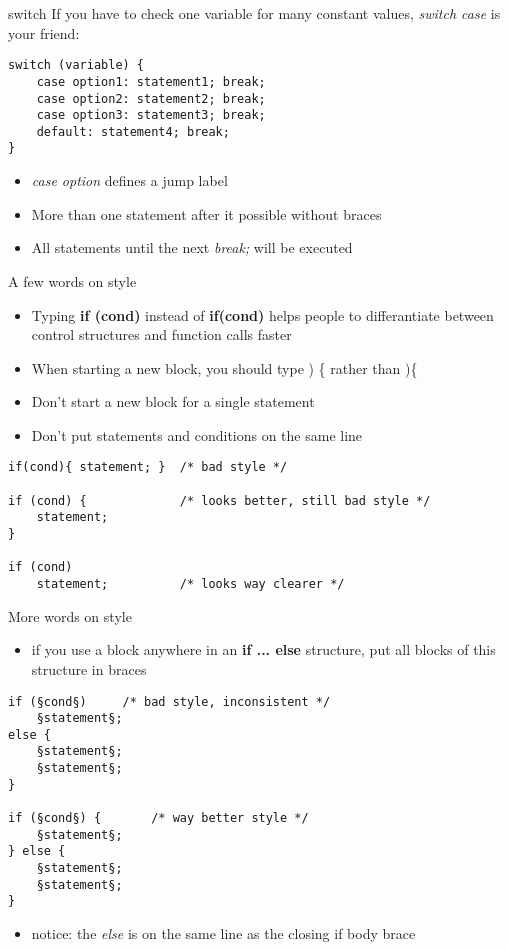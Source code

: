 \begin{frame}[fragile]{switch}
	If you have to check one variable for many constant values, \textit{switch case} is your friend:
	\begin{lstlisting}[numbers=none,basicstyle=\itshape\footnotesize]
switch (variable) {
	case option1: statement1; break;
	case option2: statement2; break;
	case option3: statement3; break;
	default: statement4; break;
}
\end{lstlisting}
	\begin{itemize}
	\item \textit{case option} defines a jump label
	\item More than one statement after it possible without braces
	\item All statements until the next \textit{break;} will be executed
\end{itemize}	 
\end{frame}
\begin{frame}[fragile]{A few words on style}

	\begin{itemize}
		\item Typing \textbf{if (cond)} instead of \textbf{if(cond)} helps people to differantiate between control structures and function calls faster
		\item When starting a new block, you should type ) \{ rather than )\{
		\item Don't start a new block for a single statement
		\item Don't put statements and conditions on the same line
	\end{itemize}
	\begin{lstlisting}[numbers=none]
if(cond){ statement; }	/* bad style */

if (cond) {				/* looks better, still bad style */
	statement;
}

if (cond)
	statement;			/* looks way clearer */
\end{lstlisting}
\end{frame}
\begin{frame}[fragile]{More words on style}
	\begin{itemize}
		\item if you use a block anywhere in an \textbf{if ... else} structure, put all blocks of this structure in braces
	\end{itemize}
	\begin{lstlisting}[numbers=none]
if (§cond§)		/* bad style, inconsistent */
	§statement§;
else {
	§statement§;
	§statement§;
}

if (§cond§) {		/* way better style */
	§statement§;
} else {
	§statement§;
	§statement§;
}
\end{lstlisting}
	\begin{itemize}
		\item notice: the \textit{else} is on the same line as the closing if body brace
	\end{itemize}
\end{frame}
